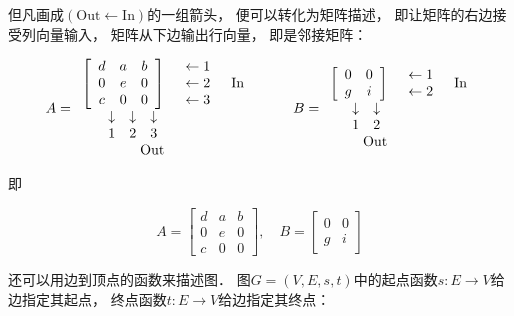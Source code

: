 \documentclass[10pt, openany]{book}
\begin{document}
但凡画成$(\text{Out} \longleftarrow \text{In})$的一组箭头，
便可以转化为矩阵描述，
即让矩阵的右边接受列向量输入，
矩阵从下边输出行向量，
即是邻接矩阵：

$$
A = \begin{array}{r @{\quad} l @{\quad} l}
 \left[ \begin{array}{ccc}
  d & a & b \\
  0 & e & 0 \\
  c & 0 & 0
 \end{array} \right] &
 \begin{array}{l} \leftarrow 1 \\ \leftarrow 2 \\ \leftarrow 3 \end{array} &
 \text{In} \\
 \begin{array}{ccc} \downarrow & \downarrow & \downarrow \\ 1 & 2 & 3 \end{array} & & \\
 \text{Out} & & 
\end{array} \quad \quad \quad
B = \begin{array}{r @{\quad} l @{\quad} l}
 \left[ \begin{array}{cc}
  0 & 0 \\
  g & i
 \end{array} \right] &
 \begin{array}{l} \leftarrow 1 \\ \leftarrow 2 \end{array} &
 \text{In} \\
 \begin{array}{cc} \downarrow & \downarrow \\ 1 & 2 \end{array} & & \\
 \text{Out} & & 
\end{array}
$$

即

$$
A = \begin{bmatrix}
 d & a & b \\
 0 & e & 0 \\
 c & 0 & 0
\end{bmatrix}, \quad
B = \begin{bmatrix}
 0 & 0 \\
 g & i
\end{bmatrix}
$$

还可以用边到顶点的函数来描述图．
图$G=(V,E,s,t)$中的起点函数$s:E \to V$给边指定其起点，
终点函数$t:E \to V$给边指定其终点：
\end{document}

